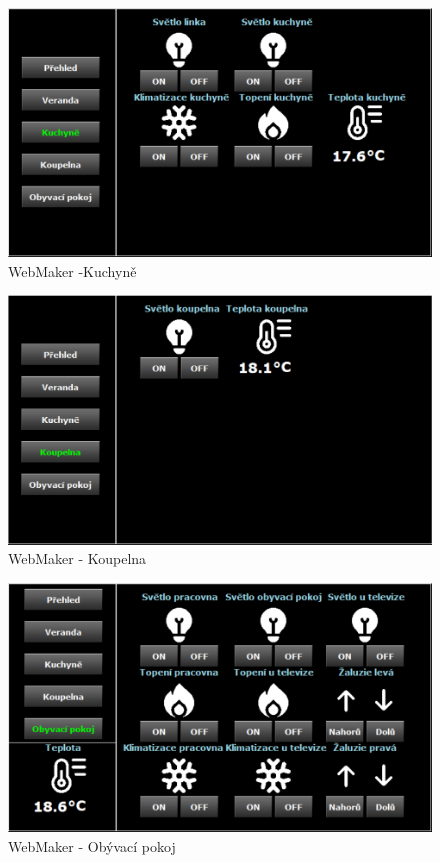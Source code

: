\begin{figure}[!ht]
  \begin{center}
  \includegraphics[scale=0.70]{obrazky/Kuchyň.png}
  \end{center}
  \caption[WebMaker - Kuchyně]{WebMaker -Kuchyně}
  \label{fig:webmaker3}
\end{figure}
\begin{figure}[!ht]
  \begin{center}
  \includegraphics[scale=0.70]{obrazky/Koupelna.png}
  \end{center}
  \caption[WebMaker - Koupelna]{WebMaker - Koupelna}
  \label{fig:webmaker4}
\end{figure}
\begin{figure}[!ht]
  \begin{center}
  \includegraphics[scale=0.70]{obrazky/Obyvaci_pokoj.png}
  \end{center}
  \caption[WebMaker - Obývací pokoj]{WebMaker - Obývací pokoj}
  \label{fig:webmake5}
\end{figure}
